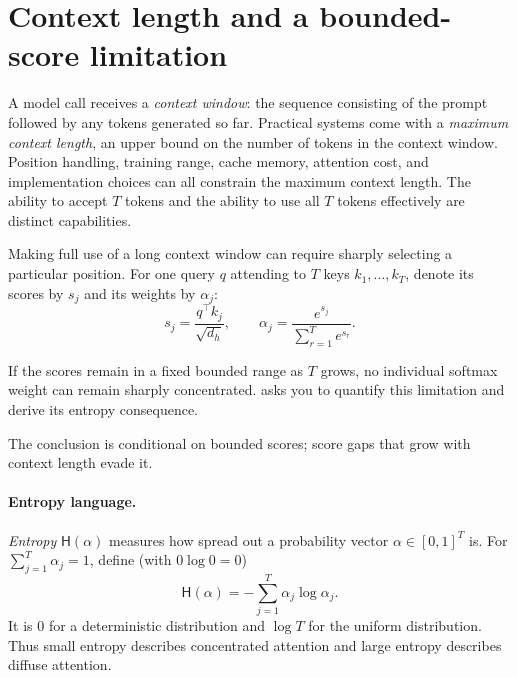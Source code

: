 \documentclass[11pt,twoside]{article}
\newcommand{\Hent}{\mathsf H}
\theoremstyle{plain}
\theoremstyle{definition}
\theoremstyle{remark}
\begin{document}
\section{Context length and a bounded-score limitation}

A model call receives a \emph{context window}: the sequence consisting of the
prompt followed by any tokens generated so far. Practical systems come with a
\emph{maximum context length}, an upper bound on the number of tokens in the
context window. Position handling, training range, cache memory, attention
cost, and implementation choices can all constrain the maximum context
length. The ability to accept $T$ tokens and the ability to use all $T$ tokens
effectively are distinct capabilities.\label{rem:long-context-failures}

Making full use of a long context window can require sharply selecting a
particular position. For one query $q$ attending to $T$ keys
$k_1,\ldots,k_T$, denote its scores by $s_j$ and its weights by $\alpha_j$:
\begin{equation}
s_j=\frac{q^\top k_j}{\sqrt{d_h}},
\qquad
\alpha_j=\frac{e^{s_j}}{\sum_{r=1}^T e^{s_r}}.
\end{equation}

If the scores remain in a fixed bounded range as $T$ grows, no individual
softmax weight can remain sharply concentrated.  asks you to quantify this limitation and derive its entropy consequence.

The conclusion is conditional on bounded scores; score gaps that grow with
context length evade it.

\paragraph{Entropy language.}
\emph{Entropy} $\Hent(\alpha)$ measures how spread out a probability vector
$\alpha\in[0,1]^T$ is. For $\sum_{j=1}^T\alpha_j=1$, define
(with $0\log0=0$)
\begin{equation}
\Hent(\alpha)=-\sum_{j=1}^T\alpha_j\log\alpha_j.
\end{equation}
It is $0$ for a deterministic distribution and $\log T$ for the uniform
distribution. Thus small entropy describes concentrated attention and large
entropy describes diffuse attention.
\end{document}
